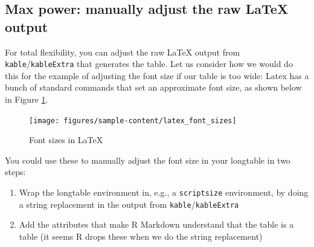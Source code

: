\documentclass[a4paper, nobind]{templates/ociamthesis}
\providecommand{\tightlist}{%
  \setlength{\itemsep}{0pt}\setlength{\parskip}{0pt}}
\begin{document}
\hypertarget{max-power}{%
\subsection{Max power: manually adjust the raw LaTeX output}\label{max-power}}

For total flexibility, you can adjust the raw LaTeX output from \texttt{kable}/\texttt{kableExtra} that generates the table.
Let us consider how we would do this for the example of adjusting the font size if our table is too wide:
Latex has a bunch of standard commands that set an approximate font size, as shown below in Figure \ref{fig:latex-font-sizing}.

\begin{figure}[H]

{\centering \texttt{[image: figures/sample-content/latex\_font\_sizes]} 

}

\caption{Font sizes in LaTeX}\label{fig:latex-font-sizing}
\end{figure}

You could use these to manually adjust the font size in your longtable in two steps:

\begin{enumerate}
\def\labelenumi{\arabic{enumi}.}
\tightlist
\item
  Wrap the longtable environment in, e.g., a \texttt{scriptsize} environment, by doing a string replacement in the output from \texttt{kable}/\texttt{kableExtra}
\item
  Add the attributes that make R Markdown understand that the table is a table (it seems R drops these when we do the string replacement)
\end{enumerate}
\end{document}
